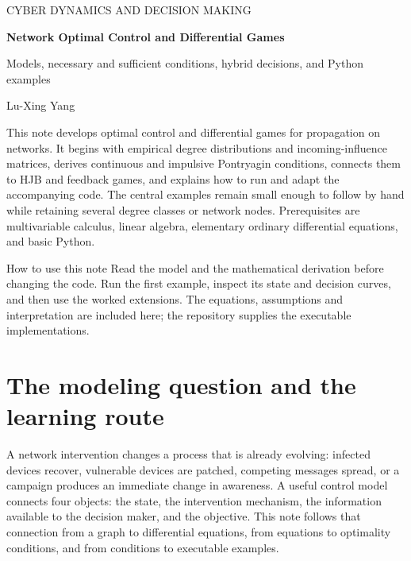 \documentclass[11pt,a4paper]{article}
\theoremstyle{definition}
\theoremstyle{remark}
\begin{document}
\thispagestyle{plain}
{\color{inkblue}\sffamily\small CYBER DYNAMICS AND DECISION MAKING}\par
\vspace{1.0cm}
{\huge\bfseries Network Optimal Control and Differential Games}\par
\vspace{0.35cm}
{\Large Models, necessary and sufficient conditions, hybrid decisions, and Python examples}\par
\vspace{0.45cm}
{\large Lu-Xing Yang}\par
\vspace{0.7cm}
This note develops optimal control and differential games for propagation on networks. It begins with empirical degree distributions and incoming-influence matrices, derives continuous and impulsive Pontryagin conditions, connects them to HJB and feedback games, and explains how to run and adapt the accompanying code. The central examples remain small enough to follow by hand while retaining several degree classes or network nodes. Prerequisites are multivariable calculus, linear algebra, elementary ordinary differential equations, and basic Python.
\vspace{0.5cm}
\begin{keyidea}{How to use this note}
Read the model and the mathematical derivation before changing the code. Run the first example, inspect its state and decision curves, and then use the worked extensions. The equations, assumptions and interpretation are included here; the repository supplies the executable implementations.
\end{keyidea}
\clearpage
\begingroup\setlength{\parskip}{0pt}\footnotesize\linespread{0.90}\selectfont\tableofcontents\endgroup
\clearpage

\section{The modeling question and the learning route}
A network intervention changes a process that is already evolving: infected devices recover, vulnerable devices are patched, competing messages spread, or a campaign produces an immediate change in awareness. A useful control model connects four objects: the state, the intervention mechanism, the information available to the decision maker, and the objective. This note follows that connection from a graph to differential equations, from equations to optimality conditions, and from conditions to executable examples.
\end{document}
